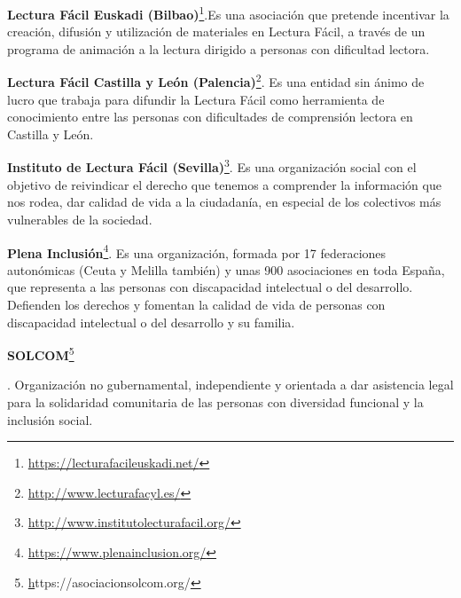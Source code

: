 \begin{itemize}
{{	\item{\textbf{Lectura Fácil Euskadi (Bilbao)}\footnote{\href{https://lecturafacileuskadi.net/}{https://lecturafacileuskadi.net/}}}.Es una asociación que pretende incentivar la creación, difusión y utilización de materiales en Lectura Fácil, a través de un programa de animación a la lectura dirigido a personas con dificultad lectora.
	
	\item{\textbf{Lectura Fácil Castilla y León (Palencia)}\footnote{\href{http://www.lecturafacyl.es/}{http://www.lecturafacyl.es/}}}. Es una entidad sin ánimo de lucro que trabaja para difundir la Lectura Fácil como herramienta de conocimiento entre las personas con dificultades de comprensión lectora en Castilla y León.
	
	\item{\textbf{Instituto de Lectura Fácil (Sevilla)}\footnote{\href{http://www.institutolecturafacil.org/}{http://www.institutolecturafacil.org/}}}. Es una organización social con el objetivo de reivindicar el derecho que tenemos a comprender la información que nos rodea, dar calidad de vida a la ciudadanía, en especial de los colectivos más vulnerables de la sociedad.
	
		\item{\textbf{Plena Inclusión}\footnote{\href{https://www.plenainclusion.org/}{https://www.plenainclusion.org/}}}. Es una organización, formada por 17 federaciones autonómicas (Ceuta y Melilla también) y unas 900 asociaciones en toda España, que representa a las personas con discapacidad intelectual o del desarrollo.	Defienden los derechos y fomentan la calidad de vida de personas con discapacidad intelectual o del desarrollo y su familia. 
		
	
		\item{\textbf{SOLCOM}}\footnote{\href{https://asociacionsolcom.org/}https://asociacionsolcom.org/}}}. Organización no gubernamental, independiente y orientada a dar asistencia legal para la solidaridad comunitaria de las personas con diversidad funcional y la inclusión social.
		
\end{itemize}

\clearpage

